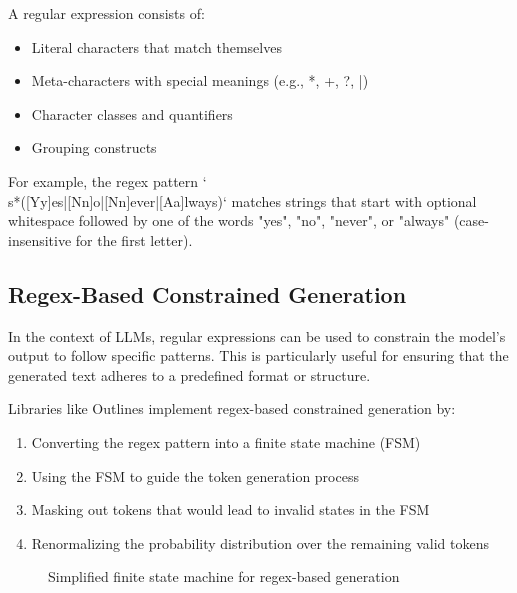 \documentclass{article}
\begin{document}
A regular expression consists of:
\begin{itemize}
    \item Literal characters that match themselves
    \item Meta-characters with special meanings (e.g., *, +, ?, |)
    \item Character classes and quantifiers
    \item Grouping constructs
\end{itemize}

For example, the regex pattern `\\s*([Yy]es|[Nn]o|[Nn]ever|[Aa]lways)` matches strings that start with optional whitespace followed by one of the words "yes", "no", "never", or "always" (case-insensitive for the first letter).

\subsection{Regex-Based Constrained Generation}

In the context of LLMs, regular expressions can be used to constrain the model's output to follow specific patterns. This is particularly useful for ensuring that the generated text adheres to a predefined format or structure.

Libraries like Outlines implement regex-based constrained generation by:
\begin{enumerate}
    \item Converting the regex pattern into a finite state machine (FSM)
    \item Using the FSM to guide the token generation process
    \item Masking out tokens that would lead to invalid states in the FSM
    \item Renormalizing the probability distribution over the remaining valid tokens
\end{enumerate}

\begin{figure}
    \centering
    \caption{Simplified finite state machine for regex-based generation}
    \label{fig:regex-fsm}
\end{figure}
\end{document}
